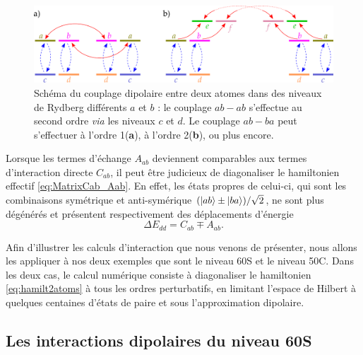 \begin{figure}[!h]
\centering
\includegraphics[width=0.9\linewidth]{figures/dipole_coupling_abab}
\caption[Couplage dipolaire entre niveaux de Rydberg différents]{Schéma du couplage dipolaire entre deux atomes dans des niveaux de Rydberg différents $a$ et $b$ : le couplage $ab-ab$ s'effectue au second ordre \textit{via} les niveaux $c$ et $d$. Le couplage $ab-ba$ peut s'effectuer à l'ordre 1(\textbf{a}), à l'ordre 2(\textbf{b}), ou plus encore.}
\label{fig:Dip_abab}
\end{figure}


Lorsque les termes d'échange $A_{ab}$ deviennent comparables aux termes d'interaction directe $C_{ab}$, il peut être judicieux de diagonaliser le hamiltonien effectif \eqref{eq:MatrixCab_Aab}.
En effet, les états propres de celui-ci, qui sont les combinaisons symétrique et anti-symérique $(\ket{ab}\pm \ket{ba})/\sqrt{2}$, ne sont plus dégénérés et présentent respectivement des déplacements d'énergie
\begin{equation}
\label{eq:shift_abab}
\Delta E_{dd} = C_{ab} \mp A_{ab}.
\end{equation}

Afin d'illustrer les calculs d'interaction que nous venons de présenter, nous allons les appliquer à nos deux exemples que sont le niveau 60S et le niveau 50C.
Dans les deux cas, le calcul numérique consiste à diagonaliser le hamiltonien \eqref{eq:hamilt2atoms} à tous les ordres perturbatifs, en limitant l'espace de Hilbert à quelques centaines d'états de paire et sous l'approximation dipolaire.

\subsection{Les interactions dipolaires du niveau 60S}

